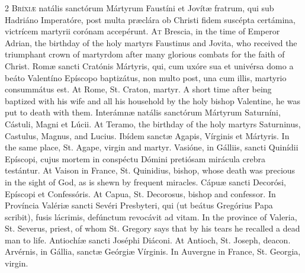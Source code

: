\begin{paracol}{2}
\lettrine[lines=2]{B}{ríxiæ} natális sanctórum Mártyrum Faustíni et 
 Jovítæ fratrum, qui sub Hadriáno Imperatóre, post multa præclára ob Christi 
 fidem suscépta certámina, victrícem martyrii corónam accepérunt.
\switchcolumn
{}
\lettrine[lines=2]{A}{t} Brescia, in the time of Emperor Adrian, the birthday of the holy martyrs 
 Faustinus and Jovita, who received the triumphant crown of martyrdom after 
 many glorious combats for the faith of Christ.
\switchcolumn*
{}
Romæ sancti Cratónis Mártyris, qui, cum uxóre 
 sua et univérsa domo a beáto Valentíno Epíscopo baptizátus, non multo post, 
 una cum illis, martyrio consummátus est.
\switchcolumn
{}
At Rome, St. Craton, martyr. A short time after being baptized with 
 his wife and all his household by the holy bishop Valentine, he was put to 
 death with them.
\switchcolumn*
{}
Interámnæ natális sanctórum Mártyrum Saturníni, 
 Cástuli, Magni et Lúcii.
\switchcolumn
{}
At Teramo, the birthday of the holy martyrs Saturninus, Castulus, Magnus, 
 and Lucius.
\switchcolumn*
{}
Ibídem sanctæ Agapis, Vírginis et Mártyris.
\switchcolumn
{}
In the same place, St. Agape, virgin and martyr.
\switchcolumn*
{}
Vasióne, in Gálliis, sancti Quinídii Epíscopi, cujus mortem in conspéctu 
 Dómini pretiósam mirácula crebra testántur.
\switchcolumn
{}
At Vaison in France, St. Quinidius, bishop, whose death was precious in the 
 sight of God, as is shewn by frequent miracles.
\switchcolumn*
{}
Cápuæ sancti Decorósi, Epíscopi et Confessóris.
\switchcolumn
{}
At Capua, St. Decorosus, bishop and confessor.
\switchcolumn*
{}
In Província Valériæ sancti Sevéri Presbyteri, 
 qui (ut beátus Gregórius Papa scribit), fusis lácrimis, defúnctum revocávit 
 ad vitam.
\switchcolumn
{}
In the province of Valeria, St. Severus, priest, of whom St. Gregory says 
 that by his tears he recalled a dead man to life.
\switchcolumn*
{}
Antiochíæ sancti Joséphi Diáconi.
\switchcolumn
{}
At Antioch, St. Joseph, deacon.
\switchcolumn*
{}
Arvérnis, in Gállia, sanctæ Geórgiæ Vírginis.
\switchcolumn
{}
In Auvergne in France, St. Georgia, virgin.
\switchcolumn*
{}
\end{paracol}


